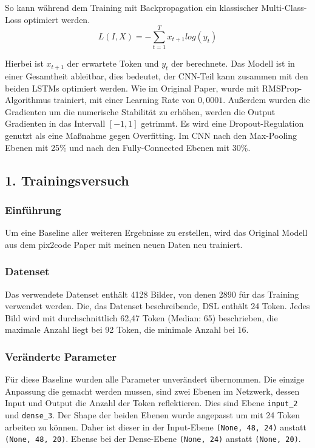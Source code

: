 \documentclass[pdftex,a4paper,halfparskip, article]{scrartcl}
\begin{document}
So kann während dem Training mit Backpropagation ein klassischer Multi-Class-Loss optimiert werden.
\begin{equation}
L(I, X) =  -\sum_{t=1}^T x_{t+1} log(y_t)
\end{equation}

Hierbei ist $x_{t+1}$ der erwartete Token und $y_t$ der berechnete. Das Modell ist in einer Gesamtheit ableitbar, dies bedeutet, der CNN-Teil kann zusammen mit den beiden LSTMs optimiert werden. Wie im Original Paper, wurde mit RMSProp-Algorithmus trainiert, mit einer Learning Rate von $0,0001$. Außerdem wurden die Gradienten um die numerische Stabilität zu erhöhen, werden die Output Gradienten in das Intervall $[-1,1]$ getrimmt. Es wird eine Dropout-Regulation genutzt als eine Maßnahme gegen Overfitting. Im CNN nach den Max-Pooling Ebenen mit 25\% und nach den Fully-Connected Ebenen mit 30\%.


\subsection{1. Trainingsversuch}

\subsubsection*{Einführung}

Um eine Baseline aller weiteren Ergebnisse zu erstellen, wird das Original Modell aus dem pix2code Paper mit meinen neuen Daten neu trainiert. 

\subsubsection*{Datenset}

Das verwendete Datenset enthält 4128 Bilder, von denen 2890 für das Training verwendet werden. Die, das Datenset beschreibende, DSL enthält 24 Token. Jedes Bild wird mit durchschnittlich 62,47 Token (Median: 65) beschrieben, die maximale Anzahl liegt bei 92 Token, die minimale Anzahl bei 16. 

\subsubsection*{Veränderte Parameter}

Für diese Baseline wurden alle Parameter unverändert übernommen. Die einzige Anpassung die gemacht werden mussen, sind zwei Ebenen im Netzwerk, dessen Input und Output die Anzahl der Token reflektieren. Dies sind Ebene \texttt{input\_2} und \texttt{dense\_3}. Der Shape der beiden Ebenen wurde angepasst um mit 24 Token arbeiten zu können. Daher ist dieser in der Input-Ebene \texttt{(None, 48, 24)} anstatt \texttt{(None, 48, 20)}. Ebense bei der Dense-Ebene \texttt{(None, 24)} anstatt \texttt{(None, 20)}.
\end{document}
